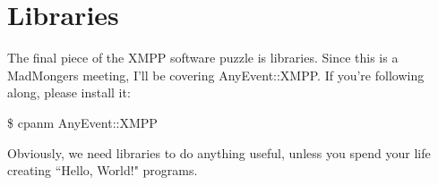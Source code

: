 \section{Libraries}

\pause
The final piece of the XMPP software puzzle is libraries.  Since this is a MadMongers meeting, I'll be covering AnyEvent::XMPP.
If you're following along, please install it:

\pause

\begin{shaded}
\$ cpanm AnyEvent::XMPP
\end{shaded}

\pause

Obviously, we need libraries to do anything useful, unless you spend your life creating ``Hello, World!" programs.
